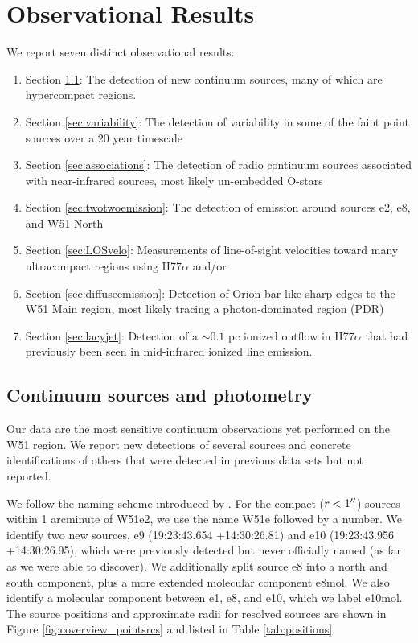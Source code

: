 \section{Observational Results}
\label{sec:results}
We report seven distinct observational results: 
\begin{enumerate}
    \item Section \ref{sec:pointsources}: The detection of new continuum
        sources, many of which are  hypercompact \hii regions. 
    \item Section \ref{sec:variability}: The detection of variability in
        some of the faint point sources over a 20 year timescale
    \item Section \ref{sec:associations}: The detection of radio continuum
        sources associated with near-infrared sources, most likely un-embedded
        O-stars
    \item Section \ref{sec:twotwoemission}: The detection of \formaldehyde
        \twotwo emission around sources e2, e8, and W51 North
    \item Section \ref{sec:LOSvelo}: Measurements of line-of-sight velocities
        toward many ultracompact \hii regions using H77$\alpha$ and/or
        \formaldehyde
    \item Section \ref{sec:diffuseemission}: Detection of Orion-bar-like sharp
        edges to the W51 Main \hii region, most likely tracing a
        photon-dominated region (PDR)
    \item Section \ref{sec:lacyjet}: Detection of a $\sim0.1$ pc ionized
        outflow in H77$\alpha$ that had previously been seen in mid-infrared
        ionized line emission.
\end{enumerate}

\subsection{Continuum sources and photometry}
\label{sec:pointsources}
Our data are the most sensitive continuum observations yet performed on the W51
region.  We report new detections of several sources and concrete
identifications of others that were detected in previous data sets but not
reported.

We follow the naming scheme introduced by \citet{Mehringer1994a}.  For the
compact ($r<1\mbox{$^{\prime\prime}$}$) sources within 1 arcminute of W51e2, we use the name
W51e followed by a number.  We identify two new sources, e9 (19:23:43.654
+14:30:26.81) and e10 (19:23:43.956 +14:30:26.95), which were previously
detected but never officially named (as far as we were able to discover).
We additionally split source e8 into a north and south component, plus a more
extended molecular component e8mol.  We also identify a molecular component
between e1, e8, and e10, which we label e10mol.  The source positions
and approximate radii for resolved sources are shown in Figure
\ref{fig:coverview_pointsrcs} and listed in Table \ref{tab:positions}.


